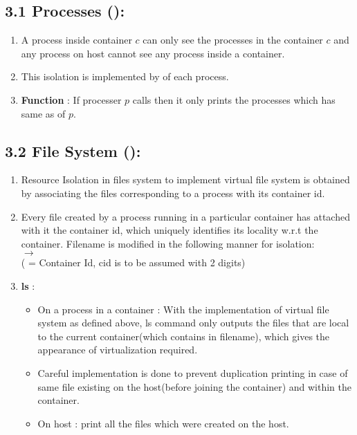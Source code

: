 \subsection*{3.1 Processes ():}
\begin{enumerate}
    \item A process inside container $c$ can only see the processes in the container $c$ and any process on host cannot see any process inside a container.
    \item This isolation is implemented by  of each process.
    \item \textbf{Function} : If processer $p$ calls  then it only prints the processes which has same  as of $p$.
\end{enumerate}

\subsection*{3.2 File System ():}

\begin{enumerate}
    \item Resource Isolation in files system to implement virtual file system is obtained by associating the files corresponding to a process with its container id.
    \item Every file created by a process running in a particular container has attached with it the container id, which uniquely identifies its locality w.r.t the container. Filename is modified in the following manner for isolation:\\
     \hspace*{2cm}    $\rightarrow$  \\
     \hspace*{4cm} ( = Container Id, cid is to be assumed with 2 digits)
    \item \textbf{ls }:
    \begin{itemize}
        \item On a process in a container : With the implementation of virtual file system as defined above, ls command only outputs the files that are local to the current container(which contains  in filename), which gives the appearance of virtualization required.
        \item Careful implementation is done to prevent duplication printing in case of same file existing on the host(before joining the container) and within the container.
        \item On host : print all the files which were created on the host.
    \end{itemize}
    
\end{enumerate}

